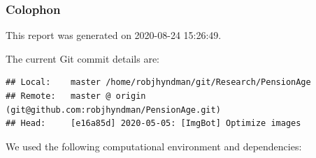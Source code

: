 \documentclass[11pt,a4paper,]{article}
\begin{document}
\newpage

\hypertarget{colophon}{%
\subsubsection*{Colophon}\label{colophon}}

This report was generated on 2020-08-24 15:26:49.

The current Git commit details are:

\begin{verbatim}
## Local:    master /home/robjhyndman/git/Research/PensionAge
## Remote:   master @ origin (git@github.com:robjhyndman/PensionAge.git)
## Head:     [e16a85d] 2020-05-05: [ImgBot] Optimize images
\end{verbatim}

We used the following computational environment and dependencies:
\end{document}
